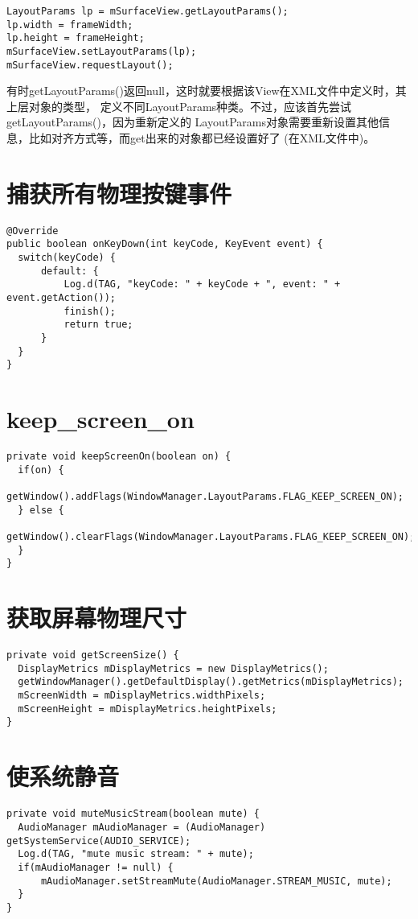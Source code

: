 \begin{verbatim}
LayoutParams lp = mSurfaceView.getLayoutParams();
lp.width = frameWidth;
lp.height = frameHeight;
mSurfaceView.setLayoutParams(lp);
mSurfaceView.requestLayout();
\end{verbatim}

有时getLayoutParams()返回null，这时就要根据该View在XML文件中定义时，其上层对象的类型，
定义不同LayoutParams种类。不过，应该首先尝试getLayoutParams()，因为重新定义的
LayoutParams对象需要重新设置其他信息，比如对齐方式等，而get出来的对象都已经设置好了
(在XML文件中)。

\section[捕获所有物理按键事件]{捕获所有物理按键事件}
\begin{verbatim}
@Override
public boolean onKeyDown(int keyCode, KeyEvent event) {
  switch(keyCode) {
      default: {
          Log.d(TAG, "keyCode: " + keyCode + ", event: " + event.getAction());
          finish();
          return true;
      }
  }
}
\end{verbatim}

\section[keep\_screen\_on]{keep\_screen\_on}
\begin{verbatim}
private void keepScreenOn(boolean on) {
  if(on) {
      getWindow().addFlags(WindowManager.LayoutParams.FLAG_KEEP_SCREEN_ON);
  } else {
      getWindow().clearFlags(WindowManager.LayoutParams.FLAG_KEEP_SCREEN_ON);
  }
}
\end{verbatim}

\section[获取屏幕物理尺寸]{获取屏幕物理尺寸}
\begin{verbatim}
private void getScreenSize() {
  DisplayMetrics mDisplayMetrics = new DisplayMetrics();
  getWindowManager().getDefaultDisplay().getMetrics(mDisplayMetrics);
  mScreenWidth = mDisplayMetrics.widthPixels;
  mScreenHeight = mDisplayMetrics.heightPixels;
}
\end{verbatim}

\section[使系统静音]{使系统静音}
\begin{verbatim}
private void muteMusicStream(boolean mute) {
  AudioManager mAudioManager = (AudioManager) getSystemService(AUDIO_SERVICE);
  Log.d(TAG, "mute music stream: " + mute);
  if(mAudioManager != null) {
      mAudioManager.setStreamMute(AudioManager.STREAM_MUSIC, mute);
  }
}
\end{verbatim}

